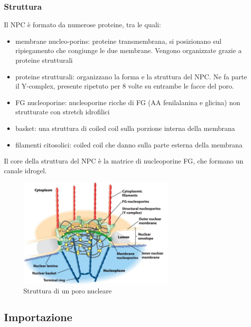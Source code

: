         \subsubsection{Struttura}
            Il NPC è formato da numerose proteine, tra le quali:
            \begin{itemize}
                \item membrane nucleo-porins: proteine transmembrana, si posizionano sul ripiegamento  che congiunge le due membrane. Vengono organizzate grazie a proteine strutturali
                \item proteine strutturali: organizzano la forma e la struttura del NPC. Ne fa parte il Y-complex, presente ripetuto per 8 volte su entrambe le facce del poro.
                \item FG nucleoporine: nucleoporine ricche di FG (AA fenilalanina e glicina) non strutturate con stretch idrofilici
                \item basket: una struttura di coiled coil sulla porzione interna della membrana
                \item filamenti citosolici: coiled coil che danno sulla parte esterna della membrana
            \end{itemize}
            Il core della struttura del NPC è la matrice di nucleoporine FG, che formano un canale idrogel. 
            \begin{figure}[h]
                \centering
                \includegraphics[width=0.7\textwidth]{images/poroNucleare.JPG}
                \caption{\small Struttura di un poro nucleare}
                \label{fig:mesh1}
            \end{figure}
        
    \subsection{Importazione}
